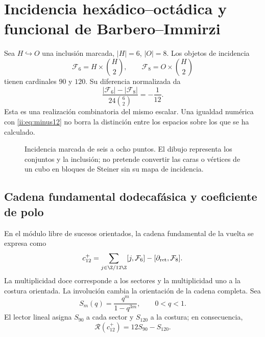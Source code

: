 \section{Incidencia hexádico--octádica y funcional de Barbero--Immirzi}
\label{ii:sec:barbero}
Sea $H\hookrightarrow O$ una inclusión marcada, $|H|=6$, $|O|=8$.
Los objetos de incidencia
\[
\mathcal F_6=H\times\binom H2,\qquad
\mathcal F_8=O\times\binom H2
\]
tienen cardinales $90$ y $120$. Su diferencia normalizada da
\[
\frac{|\mathcal F_6|-|\mathcal F_8|}{24\binom62}=-\frac1{12}.
\]
Esta es una realización combinatoria del mismo escalar.
Una igualdad numérica con \eqref{ii:eq:minus12} no borra
la distinción entre los espacios sobre los que se ha calculado.

\begin{figure}[htbp]
\centering
{}
\caption{Incidencia marcada de seis a ocho puntos. El dibujo representa
los conjuntos y la inclusión; no pretende convertir las caras o vértices
de un cubo en bloques de Steiner sin su mapa de incidencia.}
\end{figure}

\subsection{Cadena fundamental dodecafásica y coeficiente de polo}
En el módulo libre de sucesos orientados, la cadena fundamental de la vuelta se expresa como
\[
c_{12}^{+}=
\sum_{j\in\Z/12\Z}[j,\mathcal F_6]
-[\partial_{\rm ret},\mathcal F_8].
\]
La multiplicidad doce corresponde a los sectores y la multiplicidad uno
a la costura orientada. La involución cambia la orientación de la cadena
completa. Sea
\[
S_m(q)=\frac{q^m}{1-q^{3m}},\qquad 0<q<1.
\]
El lector lineal asigna $S_{90}$ a cada sector y $S_{120}$ a la costura;
en consecuencia,
\[
\mathscr R(c_{12}^{+})=12S_{90}-S_{120}.
\]


